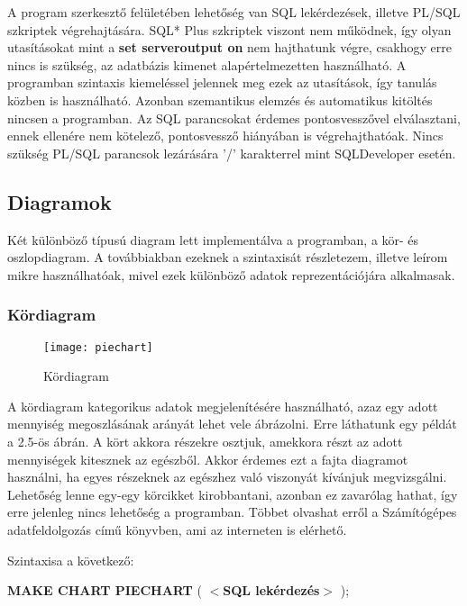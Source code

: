 A program szerkesztő felületében lehetőség van SQL lekérdezések, illetve PL/SQL szkriptek végrehajtására. SQL* Plus szkriptek viszont
nem működnek, így olyan utasításokat mint a \textbf{set serveroutput on} nem hajthatunk végre, csakhogy erre nincs is szükség, az adatbázis kimenet alapértelmezetten
használható. A programban szintaxis kiemeléssel jelennek meg ezek az utasítások, így tanulás közben is használható. Azonban szemantikus elemzés és automatikus
kitöltés nincsen a programban. Az SQL parancsokat érdemes pontosvesszővel elválasztani, ennek ellenére nem kötelező, pontosvessző hiányában is végrehajthatóak.
Nincs szükség PL/SQL parancsok lezárására '/' karakterrel mint SQLDeveloper esetén.

\subsection{Diagramok}
Két különböző típusú diagram lett implementálva a programban, a kör- és oszlopdiagram. A továbbiakban
ezeknek a szintaxisát részletezem, illetve leírom mikre használhatóak, mivel ezek különböző adatok
reprezentációjára alkalmasak.

\subsubsection{Kördiagram}
\begin{figure}[ht]
  \begin{center}
    \texttt{[image: piechart]}
  \end{center}
 \caption{Kördiagram}
\end{figure}

A kördiagram kategorikus adatok megjelenítésére használható, azaz egy adott mennyiség megoszlásának arányát lehet vele
ábrázolni. Erre láthatunk egy példát a 2.5-ös ábrán. A kört akkora részekre osztjuk, amekkora részt az adott mennyiségek kitesznek az egészből. Akkor érdemes ezt
a fajta diagramot használni, ha egyes részeknek az egészhez való viszonyát kívánjuk megvizsgálni. Lehetőség lenne egy-egy
körcikket kirobbantani, azonban ez zavarólag hathat, így erre jelenleg nincs lehetőség a programban. Többet olvashat erről a
Számítógépes adatfeldolgozás\cite{szamadat} című könyvben, ami az interneten is elérhető.

Szintaxisa a következő:

\textbf{{\color{awesomeblue} MAKE CHART PIECHART }} ( \textbf{$<$SQL lekérdezés$>$} );

